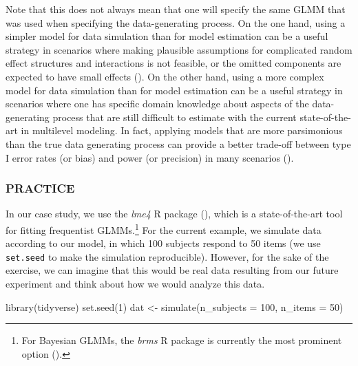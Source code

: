 \documentclass[
  man,
  floatsintext,
  longtable,
  a4paper,
  nolmodern,
  notxfonts,
  notimes,
  colorlinks=true,linkcolor=blue,citecolor=blue,urlcolor=blue]{apa7}
\newenvironment{Shaded}{\begin{snugshade}}{\end{snugshade}}
\newcommand{\AttributeTok}[1]{\textcolor[rgb]{0.40,0.45,0.13}{#1}}
\newcommand{\DecValTok}[1]{\textcolor[rgb]{0.68,0.00,0.00}{#1}}
\newcommand{\FunctionTok}[1]{\textcolor[rgb]{0.28,0.35,0.67}{#1}}
\newcommand{\NormalTok}[1]{\textcolor[rgb]{0.00,0.23,0.31}{#1}}
\newcommand{\OtherTok}[1]{\textcolor[rgb]{0.00,0.23,0.31}{#1}}
\begin{document}
Note that this does not always mean that one will specify the same GLMM
that was used when specifying the data-generating process. On the one
hand, using a simpler model for data simulation than for model
estimation can be a useful strategy in scenarios where making plausible
assumptions for complicated random effect structures and interactions is
not feasible, or the omitted components are expected to have small
effects (). On the other hand, using a more complex model for data
simulation than for model estimation can be a useful strategy in
scenarios where one has specific domain knowledge about aspects of the
data-generating process that are still difficult to estimate with the
current state-of-the-art in multilevel modeling. In fact, applying
models that are more parsimonious than the true data generating process
can provide a better trade-off between type I error rates (or bias) and
power (or precision) in many scenarios
().

\subsubsection{PRACTICE}\label{practice-6}

In our case study, we use the \emph{lme4} R package
(),
which is a state-of-the-art tool for fitting frequentist
GLMMs.\footnote{For Bayesian GLMMs, the \emph{brms} R package is
  currently the most prominent option
  ().} For
the current example, we simulate data according to our model, in which
100 subjects respond to 50 items (we use \texttt{set.seed} to make the
simulation reproducible). However, for the sake of the exercise, we can
imagine that this would be real data resulting from our future
experiment and think about how we would analyze this data.

\begin{Shaded}
\begin{Highlighting}[]
\FunctionTok{library}\NormalTok{(tidyverse)}
\FunctionTok{set.seed}\NormalTok{(}\DecValTok{1}\NormalTok{)}
\NormalTok{dat }\OtherTok{\textless{}{-}} \FunctionTok{simulate}\NormalTok{(}\AttributeTok{n\_subjects =} \DecValTok{100}\NormalTok{, }\AttributeTok{n\_items =} \DecValTok{50}\NormalTok{)}
\end{Highlighting}
\end{Shaded}
\end{document}

